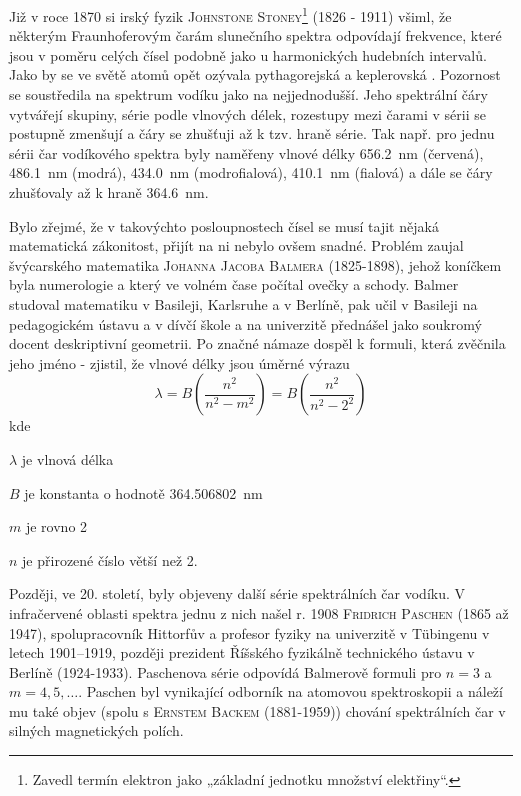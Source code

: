         Již v roce 1870 si irský fyzik \textsc{Johnstone Stoney}\footnote{Zavedl termín elektron
        jako „základní jednotku množství elektřiny“.} (1826 - 1911) všiml, že některým
        Fraunhoferovým čarám slunečního spektra odpovídají frekvence, které jsou v poměru celých
        čísel podobně jako u harmonických hudebních intervalů. Jako by se ve světě atomů opět
        ozývala pythagorejská a keplerovská . Pozornost se soustředila na spektrum
        vodíku jako na nejjednodušší. Jeho spektrální čáry vytvářejí skupiny, série podle vlnových
        délek, rozestupy mezi čarami v sérii se postupně zmenšují a čáry se zhušťuji až k tzv. hraně
        série. Tak např. pro jednu sérii čar vodíkového spektra byly naměřeny vlnové délky
        \SI{656.2}{\nm} (červená), \SI{486.1}{\nm} (modrá), \SI{434.0}{\nm} (modrofialová),
        \SI{410.1}{\nm} (fialová) a dále se čáry zhušťovaly až k hraně \SI{364.6}{\nm}.

        Bylo zřejmé, že v takovýchto posloupnostech čísel se musí tajit nějaká matematická
        zákonitost, přijít na ni nebylo ovšem snadné. Problém zaujal švýcarského matematika
        \textsc{Johanna Jacoba Balmera} (1825-1898), jehož koníčkem byla numerologie a který ve
        volném čase počítal ovečky a schody. Balmer studoval matematiku v Basileji, Karlsruhe a v
        Berlíně, pak učil v Basileji na pedagogickém ústavu a v dívčí škole a na univerzitě
        přednášel jako soukromý docent deskriptivní geometrii. Po značné námaze dospěl k formuli,
        která zvěčnila jeho jméno - zjistil, že vlnové délky jsou úměrné výrazu
        \begin{equation*}
          \lambda = B\left(\dfrac{n^2}{n^2-m^2}\right) = B\left(\dfrac{n^2}{n^2-2^2}\right)
        \end{equation*} 
        kde
        \begin{description}[leftmargin=3em,labelindent=1em, style=nextline]
          \item \(\lambda\) je vlnová délka
          \item \(B\) je konstanta o hodnotě \SI{364.506802}{\nm}
          \item \(m\) je rovno \num{2}
          \item \(n\) je přirozené číslo větší než \num{2}. 
        \end{description}

        Později, ve 20. století, byly objeveny další série spektrálních čar vodíku. V infračervené
        oblasti spektra jednu z nich našel r. 1908 \textsc{Fridrich Paschen} (1865 až 1947),
        spolupracovník Hittorfův a profesor fyziky na univerzitě v Tübingenu v letech 1901–1919,
        později prezident Říšského fyzikálně technického ústavu v Berlíně (1924-1933). Paschenova
        série odpovídá Balmerově formuli pro \(n = 3\) a \(m = 4, 5,\ldots\). Paschen byl vynikající
        odborník na atomovou spektroskopii a náleží mu také objev (spolu s \textsc{Ernstem Backem}
        (1881-1959)) chování spektrálních čar v silných magnetických polích.
    
